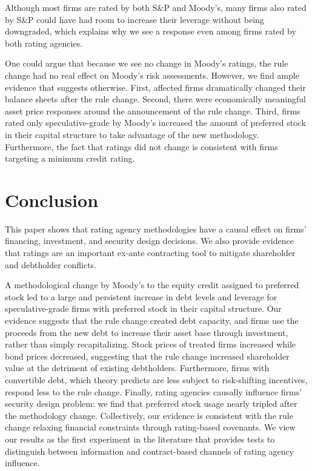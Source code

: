 \documentclass[a4paper, 12pt]{article}
\begin{document}
Although most firms are rated by both S\&P and Moody's, many firms also rated by S\&P could have had room to increase their leverage without being downgraded, which explains why we see a response even among firms rated by both rating agencies.

One could argue that because we see no change in Moody's ratings, the rule change had no real effect on Moody's risk assessments. However, we find ample evidence that suggests otherwise. First, affected firms dramatically changed their balance sheets after the rule change. Second, there were economically meaningful asset price responses around the announcement of the rule change. Third, firms rated only speculative-grade by Moody's increased the amount of preferred stock in their capital structure to take advantage of the new methodology. Furthermore, the fact that ratings did not change is consistent with firms targeting a minimum credit rating.


\section{Conclusion}

This paper shows that rating agency methodologies have a causal effect on firms' financing, investment, and security design decisions. We also provide evidence that ratings are an important ex-ante contracting tool to mitigate shareholder and debtholder conflicts.

A methodological change by Moody's to the equity credit assigned to preferred stock led to a large and persistent increase in debt levels and leverage for speculative-grade firms with preferred stock in their capital structure. Our evidence suggests that the rule change created debt capacity, and firms use the proceeds from the new debt to increase their asset base through investment, rather than simply recapitalizing. Stock prices of treated firms increased while bond prices decreased, suggesting that the rule change increased shareholder value at the detriment of existing debtholders. Furthermore, firms with convertible debt, which theory predicts are less subject to risk-shifting incentives, respond less to the rule change. Finally, rating agencies causally influence firms' security design problem: we find that preferred stock usage nearly tripled after the methodology change. Collectively, our evidence is consistent with the rule change relaxing financial constraints through rating-based covenants. We view our results as the first experiment in the literature that provides tests to distinguish between information and contract-based channels of rating agency influence.
\end{document}
